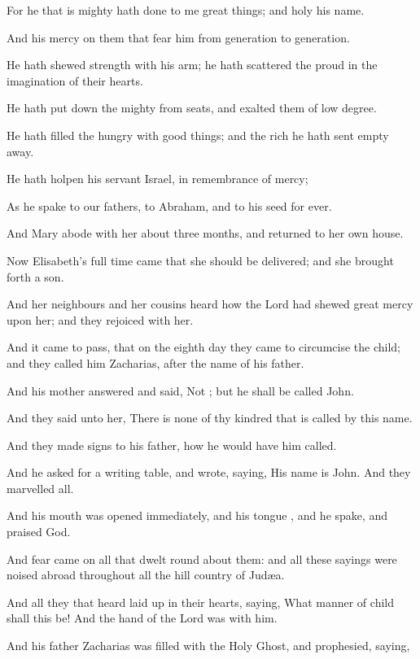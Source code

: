 {For he that is
mighty hath
done to
me great
things;
and
holy
{}
his
name.

And
his
mercy
{} on them that
fear
him
from
generation to
generation.

He hath
shewed
strength
with
his
arm; he hath
scattered the
proud in the
imagination
of
their
hearts.

He hath put
down the
mighty
from
{}
seats,
and
exalted them of low
degree.

He hath
filled the
hungry with good
things;
and the
rich he hath
sent
empty
away.

He hath
holpen
his
servant
Israel, in
remembrance
of
{}
mercy;

As he
spake
to
our
fathers, to
Abraham,
and
to
his
seed
for
ever.

And
Mary
abode
with
her
about
three
months,
and
returned
to her
own
house.

Now
Elisabeth’s
full
time
came that
she should be
delivered;
and she brought
forth a
son.

And
her
neighbours
and
her
cousins
heard
how the
Lord had shewed
great
mercy
upon
her;
and they
rejoiced with
her.

And it came to pass,
that
on the
eighth
day they
came to
circumcise the
child;
and they
called
him
Zacharias,
after the
name
of
his
father.

And
his
mother
answered and
said,
Not
{};
but he shall be
called
John.

And they
said
unto
her, There
is
none
of
thy
kindred
that is
called
by
this
name.

And they made
signs
to
his
father,
how he would
have
him
called.

And he
asked for a writing
table, and
wrote,
saying,
His
name
is
John.
And they
marvelled
all.

And
his
mouth was
opened
immediately,
and
his
tongue
{},
and he
spake, and
praised
God.

And
fear
came
on
all that dwelt round
about
them:
and
all
these
sayings were noised
abroad
throughout
all the hill
country of
Judæa.

And
all they that
heard
{}
laid
{}
up
in
their
hearts,
saying,
What
manner of
child
shall
this
be!
And the
hand of the
Lord
was
with
him.

And
his
father
Zacharias was
filled with
the
Holy
Ghost,
and
prophesied,
saying,

}
